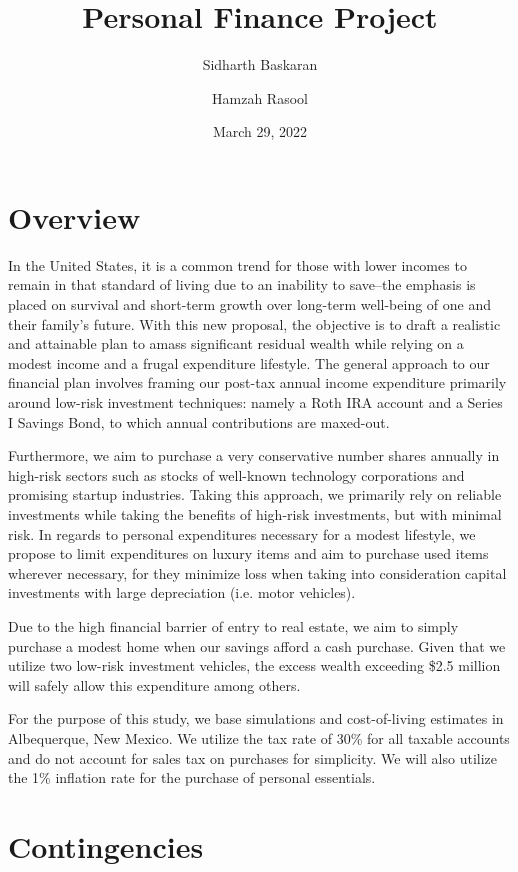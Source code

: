 \documentclass[12pt]{article}
\title{Personal Finance Project}
\author[1]{Sidharth Baskaran}
\author[1]{Hamzah Rasool}
\affil[1]{Liberal Arts and Science Academy}
\date{March 29, 2022}
\begin{document}
\maketitle

\tableofcontents
\newpage

\section{Overview}
In the United States, it is a common trend for those with lower incomes to remain in that standard of living
due to an inability to save--the emphasis is placed on survival and short-term growth over long-term well-being of one and their family's future.
With this new proposal, the objective is to draft a realistic and attainable plan
to amass significant residual wealth while relying on a modest income and a frugal expenditure lifestyle.
The general approach to our financial plan involves framing our post-tax annual income expenditure primarily around
low-risk investment techniques: namely a Roth IRA account and a Series I Savings Bond, to which annual contributions are maxed-out.

Furthermore, we aim to purchase a very conservative number shares annually in high-risk sectors such as stocks
of well-known technology corporations and promising startup industries. Taking this approach, we
primarily rely on reliable investments while taking the benefits of high-risk investments, but with minimal risk.
In regards to personal expenditures necessary for a modest lifestyle, we propose to limit expenditures on luxury items
and aim to purchase used items wherever necessary, for they minimize loss when taking into consideration
capital investments with large depreciation (i.e. motor vehicles). 

Due to the high financial barrier of
entry to real estate, we aim to simply purchase a modest home when our savings afford a cash purchase.
Given that we utilize two low-risk investment vehicles, the excess wealth exceeding \$2.5 million will
safely allow this expenditure among others.

For the purpose of this study, we base simulations and cost-of-living estimates in Albequerque, New Mexico.
We utilize the tax rate of 30\% for all taxable accounts and do not account for sales tax on purchases for simplicity.
We will also utilize the 1\% inflation rate for the purchase of personal essentials.

\section{Contingencies}
\end{document}
